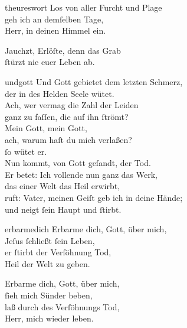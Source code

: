 \documentclass[shorttitlesize=55,tocstyle=ref-genre]{ees}
\begin{document}
{\begin{movement}{theureswort}
  \voice[Alto]
  Los von aller Furcht und Plage\\
  geh ich an demſelben Tage,\\
  Herr, in deinen Himmel ein.

  \voice[both]
  Jauchzt, Erlöſte, denn das Grab\\
  ſtürzt nie euer Leben ab.
\end{movement}

\begin{movement}{undgott}
  \voice[Soprano]
  Und Gott gebietet dem letzten Schmerz,\\
  der in des Helden Seele wütet.\\
  Ach, wer vermag die Zahl der Leiden\\
  ganz zu faſſen, die auf ihn ſtrömt?\\
  Mein Gott, mein Gott,\\
  ach, warum haſt du mich verlaßen?\\
  ſo wütet er.\\
  Nun kommt, von Gott geſandt, der Tod.\\
  Er betet: Ich vollende nun ganz das Werk,\\
  das einer Welt das Heil erwirbt,\\
  ruft: Vater, meinen Geiſt geb ich in deine Hände;\\
  und neigt ſein Haupt und ſtirbt.
\end{movement}

\begin{movement}{erbarmedich}
  \voice[Tenore I, II]
  Erbarme dich, Gott, über mich,\\
  Jeſus ſchließt ſein Leben,\\
  er ſtirbt der Verſöhnung Tod,\\
  Heil der Welt zu geben.

  Erbarme dich, Gott, über mich,\\
  ſieh mich Sünder beben,\\
  laß durch des Verſöhnungs Tod,\\
  Herr, mich wieder leben.
\end{movement}

}
\end{document}
